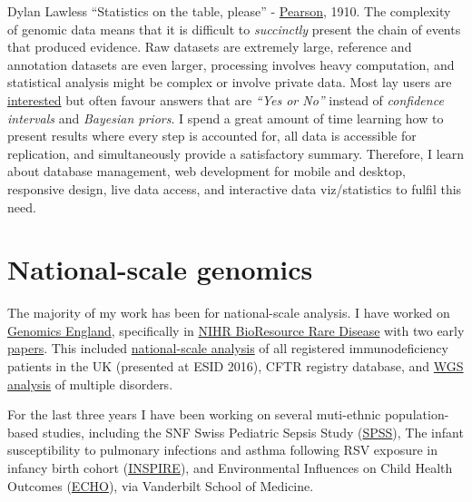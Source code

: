 \documentclass[11pt,a4paper]{article}
\begin{document}
\begin{cv}{Dylan Lawless}
``Statistics on the table, please'' -
\href{https://www.hup.harvard.edu/catalog.php?isbn=9780674009790}{Pearson}, 1910.
The complexity of genomic data means that it is difficult to \textit{succinctly}  present the chain of events that produced evidence.
Raw datasets are extremely large, reference and annotation datasets are even larger, processing involves heavy computation, and statistical analysis might be complex or involve private data.
Most lay users are 
\href{https://lawlessgenomics.com/2021/09/21/whos_afraid.html}{interested} 
but often favour answers that are \textit{``Yes or No''} instead of \textit{confidence intervals} and \textit{Bayesian priors}.
I spend a great amount of time learning how to present results where every step is accounted for, all data is accessible for replication, and simultaneously provide a satisfactory summary.
Therefore, I learn about database management, web development for mobile and desktop, responsive design, live data access, and interactive data viz/statistics to fulfil this need.

\section*{National-scale genomics}
The majority of my work has been for national-scale analysis.
I have worked on
\href{https://www.genomicsengland.co.uk/understanding-genomics/rare-disease-genomics/}{Genomics England}, specifically in 
\href{https://bioresource.nihr.ac.uk/using-our-bioresource/our-cohorts/rare-diseases-bioresource/}{NIHR BioResource Rare Disease} 
with two early 
\href{https://bioresource.nihr.ac.uk/publications/?term=lawless&year=}{papers}.
This included
\href{https://lawlessgenomics.com/portfolio#national-scale}{national-scale analysis} of all registered immunodeficiency patients in the UK (presented at ESID 2016),
CFTR registry database, 
and
\href{https://lawlessgenomics.com/portfolio#igv}{WGS analysis}
of multiple disorders.

For the last three years I have been working on several muti-ethnic population-based studies, including the SNF Swiss Pediatric Sepsis Study (\href{https://publications.aap.org/pediatrics/article-abstract/128/2/e348/30626/Impact-of-Sepsis-on-Neurodevelopmental-Outcome-in?redirectedFrom=fulltext}{SPSS}),
The infant susceptibility to pulmonary infections and asthma following RSV exposure in infancy birth cohort 
(\href{https://my.vanderbilt.edu/inspire/about-me/}{INSPIRE}),
and Environmental Influences on Child Health Outcomes (\href{https://my.vanderbilt.edu/inspire/echo-crew/}{ECHO}),
via Vanderbilt School of Medicine.


\end{cv}
\end{document}
